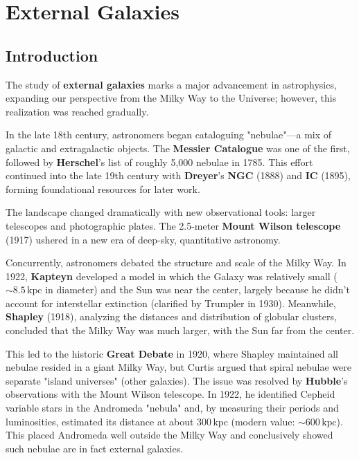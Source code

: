 \chapter{External Galaxies}

\section{Introduction}

The study of \textbf{external galaxies} marks a major advancement in astrophysics, expanding our perspective from the Milky Way to the Universe; however, this realization was reached gradually.

In the late 18th century, astronomers began cataloguing "nebulae"—a mix of galactic and extragalactic objects. The \textbf{Messier Catalogue} was one of the first, followed by \textbf{Herschel}'s list of roughly 5,000 nebulae in 1785. This effort continued into the late 19th century with \textbf{Dreyer}'s \textbf{NGC} (1888) and \textbf{IC} (1895), forming foundational resources for later work.

The landscape changed dramatically with new observational tools: larger telescopes and photographic plates. The 2.5-meter \textbf{Mount Wilson telescope} (1917) ushered in a new era of deep-sky, quantitative astronomy.

Concurrently, astronomers debated the structure and scale of the Milky Way. In 1922, \textbf{Kapteyn} developed a model in which the Galaxy was relatively small ($\sim8.5\,\mathrm{kpc}$ in diameter) and the Sun was near the center, largely because he didn't account for interstellar extinction (clarified by Trumpler in 1930). Meanwhile, \textbf{Shapley} (1918), analyzing the distances and distribution of globular clusters, concluded that the Milky Way was much larger, with the Sun far from the center.

This led to the historic \textbf{Great Debate} in 1920, where Shapley maintained all nebulae resided in a giant Milky Way, but Curtis argued that spiral nebulae were separate "island universes" (other galaxies). The issue was resolved by \textbf{Hubble}'s observations with the Mount Wilson telescope. In 1922, he identified Cepheid variable stars in the Andromeda "nebula" and, by measuring their periods and luminosities, estimated its distance at about $300\,\mathrm{kpc}$ (modern value: $\sim 600\,\mathrm{kpc}$). This placed Andromeda well outside the Milky Way and conclusively showed such nebulae are in fact external galaxies.

